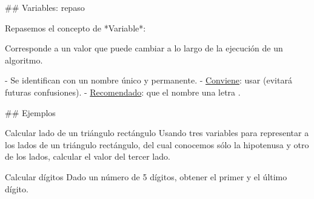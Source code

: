 ## Variables: repaso

Repasemos el concepto de *Variable*:

\vfill

\bgnblockdefinition
{} Corresponde a un valor que puede cambiar a lo largo de la ejecución de un algoritmo.
\trmblockdefinition

\bgncolumns
{}

- Se identifican con un nombre único y permanente.
    - \underline{Conviene}: usar  (evitará futuras confusiones).
    - \underline{Recomendado}: que el nombre  una letra .

\vspace{2ex}
\small
{}
\trmcolumns

## Ejemplos

\begin{block}{Calcular lado de un triángulo rectángulo}
Usando tres variables para representar a los lados de un triángulo rectángulo, del
cual conocemos sólo la hipotenusa y otro de los lados, calcular el valor
del tercer lado.
\end{block}

\begin{block}{Calcular dígitos}
Dado un número de 5 dígitos, obtener el primer y el último dígito.
\end{block}

